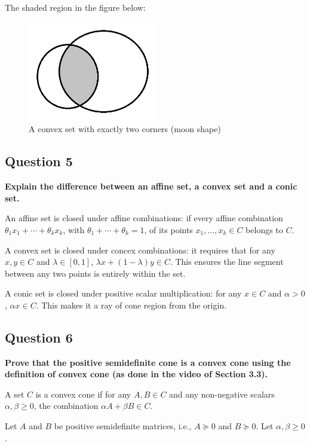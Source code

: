 The shaded region in the figure below: 

\begin{figure}[h]
\centering
\includegraphics[width=0.5\textwidth]{MyAnswers/Images/image_2_1.png}
\caption{A convex set with exactly two corners (moon shape)}
\end{figure}

\subsection*{Question 5}
\textbf{Explain the diﬀerence between an affine set, a convex set and a conic set.}

An affine set is closed under affine combinations: if every affine combination $\theta_1 x_1 + \cdots+ \theta_k x_k$, with $\theta_1 + \cdots+\theta_k = 1$, of its points  $x_1, \dots, x_k \in C$ belongs to $C$. 

A convex set is closed under concex combinations: it requires that for any \( x, y \in C \) and \( \lambda \in [0,1] \), \( \lambda x + (1-\lambda)y \in C \). This ensures the line segment between any two points is entirely within the set.

A conic set is closed under positive scalar multiplication: for any \( x \in C \) and \( \alpha > 0 \), \( \alpha x \in C \). This makes it a ray of cone region from the origin. 

\subsection*{Question 6}
\textbf{Prove that the positive semideﬁnite cone is a convex cone using the deﬁnition of convex cone (as done in the video of Section 3.3).}

A set \( C \) is a convex cone if for any \( A, B \in C \) and any non-negative scalars \( \alpha, \beta \geq 0 \), the combination \( \alpha A + \beta B \in C \).

Let \( A \) and \( B \) be positive semidefinite matrices, i.e., \( A \succeq 0 \) and \( B \succeq 0 \). Let \( \alpha, \beta \geq 0 \).

